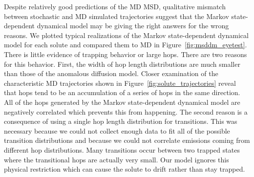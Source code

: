 \documentclass[journal=jctcce,manuscript=article]{achemso}
\begin{document}
  Despite relatively good predictions of the MD MSD, qualitative mismatch
  between stochastic and MD simulated trajectories suggest that the Markov
  state-dependent dynamical model may be giving the right answers for the
  wrong reasons. We plotted typical realizations of the Markov state-dependent
  dynamical model for each solute and compared them to MD in 
  Figure~\ref{fig:msddm_eyetest}. There is little evidence of trapping behavior
  or large hops. There are two reasons for this behavior. First, the width of
  hop length distributions are much smaller than those of the anomalous diffusion
  model. Closer examination of the characteristic MD trajectories shown in
  Figure~\ref{fig:solute_trajectories} reveal that hops tend to be an
  accumulation of a series of hops in the same direction. All of the hops generated
  by the Markov state-dependent dynamical model are negatively correlated which
  prevents this from happening. The second reason is a consequence of using a 
  single hop length distribution for transitions. This was necessary because we 
  could not collect enough data to fit all of the possible transition distributions
  and because we could not correlate emissions coming from different hop 
  distributions. Many transitions occur between two trapped states where the 
  transitional hops are actually very small. Our model ignores this physical 
  restriction which can cause the solute to drift rather than stay trapped.
  
\end{document}
